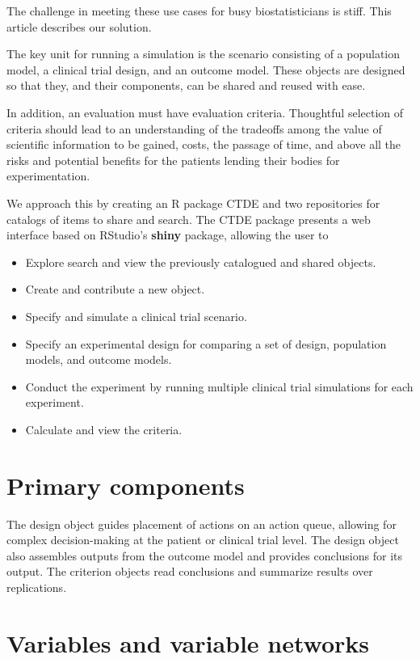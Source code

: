 \documentclass[12pt]{amsart}
\newcommand{\Rcode}[1]{{\textbf{#1}}}
\begin{document}
The challenge in meeting these use cases for busy biostatisticians is stiff.
This article describes our solution.

The key unit for running a simulation is the scenario consisting of a
 population model, a clinical trial design, and an outcome model. 
These objects are designed so that they, and their components,
can be shared and reused with ease.

In addition, an evaluation must have  evaluation criteria. 
Thoughtful selection of criteria should lead to an understanding of
the tradeoffs among the value of scientific information to be gained, costs,
the passage of time, and above all the risks and potential benefits for the patients
lending their bodies for experimentation.

We approach this by creating  an R package CTDE
and two repositories for catalogs of items to share and search.
The CTDE package presents a web interface based on RStudio's \Rcode{shiny}
package, allowing the user to 
\begin{itemize}
\item Explore search and view the previously catalogued and shared objects.
\item Create and contribute a new object.
\item Specify and simulate a clinical trial scenario.
\item Specify an experimental design for comparing a set of design, population models, and outcome models.
\item Conduct the experiment by running multiple clinical trial simulations for each experiment.
\item Calculate and view the criteria. 
\end{itemize}

\section{Primary components}

The design object guides placement of actions on an action queue, 
allowing for complex decision-making at the patient or clinical trial level. 
The design object also assembles outputs from the outcome model and provides conclusions for its output. 
The criterion objects read conclusions and summarize results over replications.

\section{Variables and variable networks}
\end{document}

